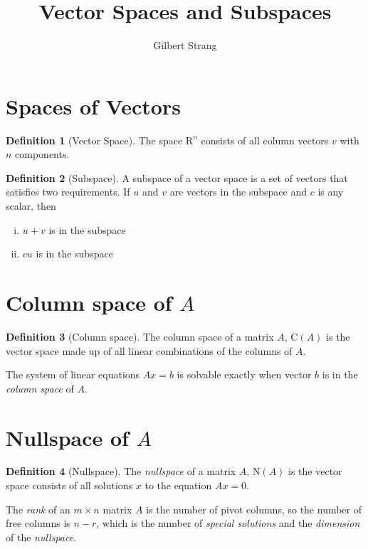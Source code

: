 \documentclass{tufte-handout}
\author{Gilbert Strang}
\title{Vector Spaces and Subspaces}
\theoremstyle{definition} \newtheorem{definition}{Definition}
\begin{document}
\maketitle

\section{Spaces of Vectors}
\begin{definition}[Vector Space]
  The space $\mathrm{R}^n$ consists of all column vectors $v$ with
  $n$ components.
\end{definition}

\begin{definition}[Subspace]
  A subspace of a vector space is a set of vectors that satisfies two
  requirements. If $u$ and $v$ are vectors in the subspace and $c$ is
  any scalar, then
  \begin{enumerate}[(i)]
  \item $u + v$ is in the subspace
  \item $cu$ is in the subspace
  \end{enumerate}
\end{definition}

\section{Column space of $A$}
\begin{definition}[Column space]
  The column space of a matrix $A$, $\mathrm{C}(A)$ is the
  vector space made up of all linear combinations of the columns of $A$.
\end{definition}

\newthought{}The system of linear equations $Ax = b$ is solvable exactly
when vector $b$ is in the \emph{column space} of $A$.

\section{Nullspace of $A$}
\begin{definition}[Nullspace]
  The \emph{nullspace} of a matrix $A$, $\mathrm{N}(A)$ is the vector
  space consists of all solutions $x$ to the equation $Ax = 0$.
\end{definition}

\newthought{}The \emph{rank} of an $m \times n$ matrix $A$ is the number
of pivot columns, so the number of free columns is $n - r$, which is the
number of \emph{special solutions} and the \emph{dimension} of the
\emph{nullspace}.
\end{document}
